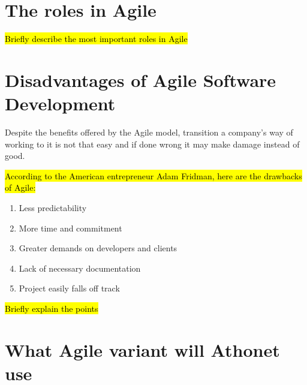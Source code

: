 



\section{The roles in Agile}
\hl{Briefly describe the most important roles in Agile}

\section{Disadvantages of Agile Software Development}
	
	Despite the benefits offered by the Agile model, transition a company's way of working to it is not that easy and if done wrong it may make damage instead of good.

	\hl{According to the American entrepreneur Adam Fridman, here are the drawbacks of Agile:}
	\begin{enumerate}
		\item Less predictability
		\item More time and commitment
		\item Greater demands on developers and clients
		\item Lack of necessary documentation
		\item Project easily falls off track
	\end{enumerate}
	\hl{Briefly explain the points}
	
\section{What Agile variant will Athonet use}

